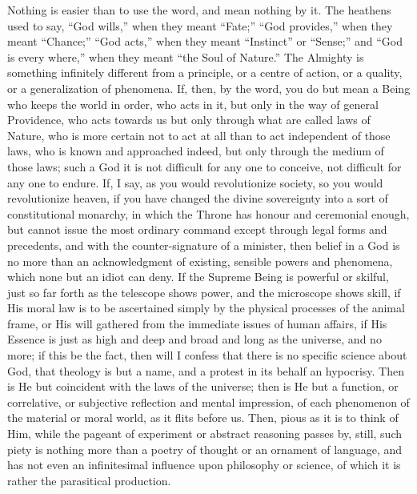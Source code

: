 Nothing is easier than to use the word, and mean nothing by it. The
heathens used to say, ``God wills,'' when they meant
``Fate;'' ``God provides,'' when they meant
``Chance;'' ``God acts,'' when they meant
``Instinct'' or ``Sense;'' and ``God is every
where,'' when they meant ``the Soul of Nature.'' The
Almighty is something infinitely different from a principle, or a
centre of action, or a quality, or a generalization of phenomena. If,
then, by the word, you do but mean a Being who keeps the world in
order, who acts in it, but only in the way of general Providence, who
acts towards us but only through what are called laws of Nature,
who is more certain not to act at all than to act independent of those
laws, who is known and approached indeed, but only through the medium
of those laws; such a God it is not difficult for any one to conceive,
not difficult for any one to endure. If, I say, as you would
revolutionize society, so you would revolutionize heaven, if you have
changed the divine sovereignty into a sort of constitutional monarchy,
in which the Throne has honour and ceremonial enough, but cannot issue
the most ordinary command except through legal forms and precedents,
and with the counter-signature of a minister, then belief in a God is
no more than an acknowledgment of existing, sensible powers and
phenomena, which none but an idiot can deny. If the Supreme Being is
powerful or skilful, just so far forth as the telescope shows power,
and the microscope shows skill, if His moral law is to be ascertained
simply by the physical processes of the animal frame, or His will
gathered from the immediate issues of human affairs, if His Essence is
just as high and deep and broad and long as the universe, and no more;
if this be the fact, then will I confess that there is no specific
science about God, that theology is but a name, and a protest in its
behalf an hypocrisy. Then is He but coincident with the laws of the
universe; then is He but a function, or correlative, or subjective
reflection and mental impression, of each phenomenon of the material
or moral world, as it flits before us. Then, pious as it is to think
of Him, while the pageant of experiment or abstract reasoning passes
by, still, such piety is nothing more than a poetry of thought or an
ornament of language, and has not even an infinitesimal influence upon
philosophy or science, of which it is rather the parasitical
production.

